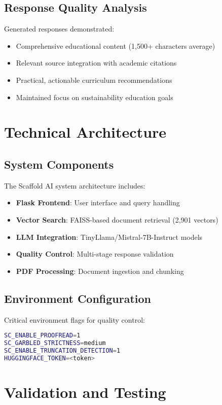 \documentclass[12pt,a4paper]{article}
\begin{document}
\subsection{Response Quality Analysis}
Generated responses demonstrated:
\begin{itemize}
    \item Comprehensive educational content (1,500+ characters average)
    \item Relevant source integration with academic citations
    \item Practical, actionable curriculum recommendations
    \item Maintained focus on sustainability education goals
\end{itemize}

\section{Technical Architecture}

\subsection{System Components}
The Scaffold AI system architecture includes:

\begin{itemize}
    \item \textbf{Flask Frontend}: User interface and query handling
    \item \textbf{Vector Search}: FAISS-based document retrieval (2,901 vectors)
    \item \textbf{LLM Integration}: TinyLlama/Mistral-7B-Instruct models
    \item \textbf{Quality Control}: Multi-stage response validation
    \item \textbf{PDF Processing}: Document ingestion and chunking
\end{itemize}

\subsection{Environment Configuration}
Critical environment flags for quality control:
\begin{lstlisting}[language=bash, caption=Environment configuration]
SC_ENABLE_PROOFREAD=1
SC_GARBLED_STRICTNESS=medium
SC_ENABLE_TRUNCATION_DETECTION=1
HUGGINGFACE_TOKEN=<token>
\end{lstlisting}

\section{Validation and Testing}
\end{document}
